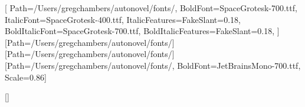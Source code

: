 \usepackage{fontspec}
\usepackage{xcolor}
\usepackage[margin=0.9in,top=0.85in,bottom=0.95in]{geometry}
\usepackage{titlesec}
\usepackage{colortbl}
\usepackage{array}
\usepackage{fancyhdr}
\usepackage{microtype}
\usepackage{adjustbox}


\pagecolor{void}
\color{paper}

\def\fontsdir{/Users/gregchambers/autonovel/fonts/}
\setmainfont{SpaceGrotesk-400.ttf}[
  Path=\fontsdir,
  BoldFont=SpaceGrotesk-700.ttf,
  ItalicFont=SpaceGrotesk-400.ttf, ItalicFeatures={FakeSlant=0.18},
  BoldItalicFont=SpaceGrotesk-700.ttf, BoldItalicFeatures={FakeSlant=0.18},
]
\newfontfamily{}[Path=\fontsdir]
\newfontfamily{}[Path=\fontsdir]
\setmonofont{JetBrainsMono-400.ttf}[Path=\fontsdir, BoldFont=JetBrainsMono-700.ttf, Scale=0.86]

\setlength{\parindent}{0pt}
\setlength{\parskip}{6pt}
\linespread{1.08}

\everymath{\color{cyan}}
\everydisplay{\color{cyan}}

\titleformat{\section}{\displaysemi\large\color{pink}}{}{0pt}{\MakeUppercase}
  [{\color{pink!45}\titlerule[1pt]}]
\titlespacing*{\section}{0pt}{16pt}{8pt}
\titleformat{\subsection}{\displaysemi\normalsize\color{amber}}{}{0pt}{}
\titlespacing*{\subsection}{0pt}{12pt}{4pt}
\titleformat{\subsubsection}{\bfseries\color{cyan}}{}{0pt}{}
\titlespacing*{\subsubsection}{0pt}{10pt}{2pt}

